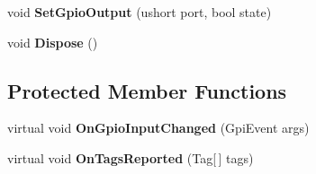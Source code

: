 \begin{DoxyCompactItemize}
\item 
void {\bfseries Set\+Gpio\+Output} (ushort port, bool state)\hypertarget{class_portais_1_1_driver_1_1_impinj_revolution_1_1_impinj_revolution_a8b95c2783cb66403c8058a142b690aa6}{}\label{class_portais_1_1_driver_1_1_impinj_revolution_1_1_impinj_revolution_a8b95c2783cb66403c8058a142b690aa6}

\item 
void {\bfseries Dispose} ()\hypertarget{class_portais_1_1_driver_1_1_impinj_revolution_1_1_impinj_revolution_a163ca2f8bce26feaa6943498fda9b4c3}{}\label{class_portais_1_1_driver_1_1_impinj_revolution_1_1_impinj_revolution_a163ca2f8bce26feaa6943498fda9b4c3}

\end{DoxyCompactItemize}
\subsection*{Protected Member Functions}
\begin{DoxyCompactItemize}
\item 
virtual void {\bfseries On\+Gpio\+Input\+Changed} (Gpi\+Event args)\hypertarget{class_portais_1_1_driver_1_1_impinj_revolution_1_1_impinj_revolution_ac41d1f9479f653be838c32333dfea80d}{}\label{class_portais_1_1_driver_1_1_impinj_revolution_1_1_impinj_revolution_ac41d1f9479f653be838c32333dfea80d}

\item 
virtual void {\bfseries On\+Tags\+Reported} (Tag\mbox{[}$\,$\mbox{]} tags)\hypertarget{class_portais_1_1_driver_1_1_impinj_revolution_1_1_impinj_revolution_a4e73514732eea1d95f632be98032b54c}{}\label{class_portais_1_1_driver_1_1_impinj_revolution_1_1_impinj_revolution_a4e73514732eea1d95f632be98032b54c}

\end{DoxyCompactItemize}
